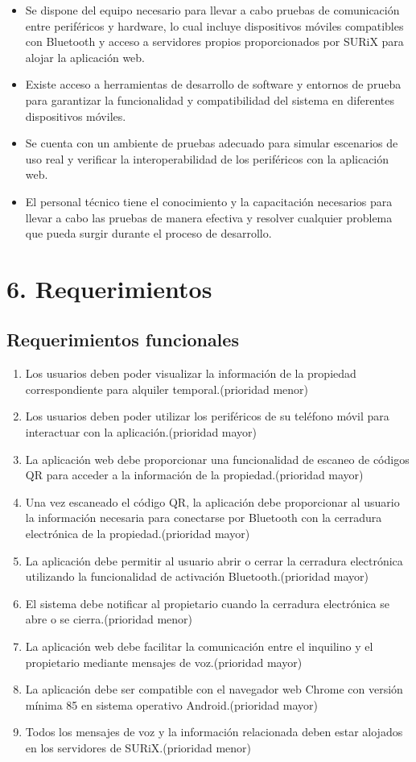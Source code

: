 \documentclass[
11pt, %
codirector, %
]{charter}
\begin{document}
\begin{itemize}
	\item Se dispone del equipo necesario para llevar a cabo pruebas de comunicación entre periféricos y hardware, lo cual incluye dispositivos móviles compatibles con Bluetooth y acceso a servidores propios proporcionados por SURiX para alojar la aplicación web.
	\item Existe acceso a herramientas de desarrollo de software y entornos de prueba para garantizar la funcionalidad y compatibilidad del sistema en diferentes dispositivos móviles.
	\item Se cuenta con un ambiente de pruebas adecuado para simular escenarios de uso real y verificar la interoperabilidad de los periféricos con la aplicación web.
        \item El personal técnico tiene el conocimiento y la capacitación necesarios para llevar a cabo las pruebas de manera efectiva y resolver cualquier problema que pueda surgir durante el proceso de desarrollo.
\end{itemize}

\section{6. Requerimientos}

\subsection{Requerimientos funcionales}
\begin{enumerate}
\item Los usuarios deben poder visualizar la información de la propiedad correspondiente para alquiler temporal.(prioridad menor)
\item Los usuarios deben poder utilizar los periféricos de su teléfono móvil para interactuar con la aplicación.(prioridad mayor)
\item La aplicación web debe proporcionar una funcionalidad de escaneo de códigos QR para acceder a la información de la propiedad.(prioridad mayor)
\item Una vez escaneado el código QR, la aplicación debe proporcionar al usuario la información necesaria para conectarse por Bluetooth con la cerradura electrónica de la propiedad.(prioridad mayor)
\item La aplicación debe permitir al usuario abrir o cerrar la cerradura electrónica utilizando la funcionalidad de activación Bluetooth.(prioridad mayor)
\item El sistema debe notificar al propietario cuando la cerradura electrónica se abre o se cierra.(prioridad menor)
\item La aplicación web debe facilitar la comunicación entre el inquilino y el propietario mediante mensajes de voz.(prioridad mayor)
\item La aplicación debe ser compatible con el navegador web Chrome con versión mínima 85 en sistema operativo Android.(prioridad mayor)
\item Todos los mensajes de voz y la información relacionada deben estar alojados en los servidores de SURiX.(prioridad menor)
\end{enumerate}
\end{document}
